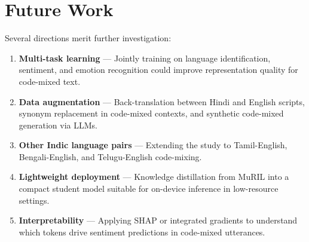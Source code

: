 \section{Future Work}

Several directions merit further investigation:

\begin{enumerate}[nosep,itemsep=3pt]
  \item \textbf{Multi-task learning} — Jointly training on language identification, sentiment, and emotion recognition could improve representation quality for code-mixed text.
  \item \textbf{Data augmentation} — Back-translation between Hindi and English scripts, synonym replacement in code-mixed contexts, and synthetic code-mixed generation via LLMs.
  \item \textbf{Other Indic language pairs} — Extending the study to Tamil-English, Bengali-English, and Telugu-English code-mixing.
  \item \textbf{Lightweight deployment} — Knowledge distillation from MuRIL into a compact student model suitable for on-device inference in low-resource settings.
  \item \textbf{Interpretability} — Applying SHAP or integrated gradients to understand which tokens drive sentiment predictions in code-mixed utterances.
\end{enumerate}

